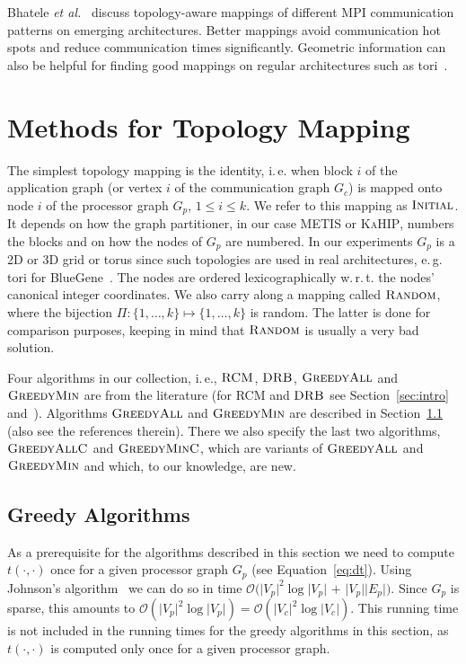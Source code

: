 \documentclass[pdftex]{llncs}
\newcommand{\eg}{e.\,g.\xspace}
\newcommand{\ie}{i.\,e.\xspace}
\newcommand{\bigO}{\mathcal{O}}
\newcommand{\etal}{\textit{et al.}\xspace}
\newcommand{\wrt}{w.\,r.\,t.\xspace}
\newcommand{\metis}{\textsc{METIS}\xspace}
\newcommand{\kahip}{\textsc{KaHIP}\xspace}
\newcommand{\initial}{\textsc{Initial}\xspace}
\newcommand{\random}{\textsc{Random}\xspace}
\newcommand{\rcm}{\textsc{RCM}\xspace}
\newcommand{\durebi}{\textsc{DRB}\xspace}
\newcommand{\greedyall}{\textsc{GreedyAll}\xspace}
\newcommand{\greedyallc}{\textsc{GreedyAllC}\xspace}
\newcommand{\greedymin}{\textsc{GreedyMin}\xspace}
\newcommand{\greedyminc}{\textsc{GreedyMinC}\xspace}
\begin{document}
Bhatele \etal~\cite{Bhatele:2011:AHT:2063384.2063486} discuss topology-aware
mappings of different MPI communication patterns on
emerging architectures. Better mappings avoid communication hot spots
and reduce communication times significantly. Geometric information
can also be helpful for finding good mappings on regular architectures
such as tori~\cite{6063073}.


\section{Methods for Topology Mapping}
\label{sec:algo}
The simplest topology mapping is the identity, \ie when block $i$ of
the application graph (or vertex $i$ of the communication graph $G_c$)
is mapped onto node $i$ of the processor graph $G_p$, $1 \leq i \leq
k$. We refer to this mapping as $\initial$. It depends on how the
graph partitioner, in our case \metis or \kahip, numbers the blocks
and on how the nodes of $G_p$ are numbered. In our experiments $G_p$
is a 2D or 3D grid or torus since such topologies are used in real architectures,
\eg tori for BlueGene~\cite{BlueGene02overview}.
The nodes are ordered
lexicographically \wrt the nodes' canonical integer coordinates. We
also carry along a mapping called $\random$, where the bijection $\Pi:
\{1, \dots, k\} \mapsto \{1, \dots, k\}$ is random. The latter is done
for comparison purposes, keeping in mind that $\random$ is usually a
very bad solution.

Four algorithms in our collection, \ie, $\rcm$, $\durebi$,
$\greedyall$ and $\greedymin$ are from the literature (for \rcm and
$\durebi$ see Section~\ref{sec:intro}
and~\cite{Cuthill69a,hoefler-topomap}). Algorithms $\greedyall$
and $\greedymin$ are described in Section~\ref{subsec:greedy} 
(also see the references therein). There we also specify the last two
algorithms, $\greedyallc$ and $\greedyminc$, which are variants of
$\greedyall$ and $\greedymin$ and which, to our knowledge, are new.

\subsection{Greedy Algorithms}
\label{subsec:greedy}
As a prerequisite for the algorithms described in this section we need
to compute $t(\cdot, \cdot)$ once for a given processor graph $G_p$
(see Equation~\ref{eq:dt}). Using Johnson's
algorithm~\cite{Johnson77a,Cormen2001a} we can do so in time
$\bigO(\vert V_p \vert^2 \log \vert V_p \vert$ $+$ $\vert V_p \vert
\vert E_p \vert)$. Since $G_p$ is sparse, this amounts to $\bigO(\vert
V_p \vert^2 \log \vert V_p \vert) = \bigO(\vert V_c \vert^2 \log \vert
V_c \vert)$. This running time is not included in the running times
for the greedy algorithms in this section, as $t(\cdot, \cdot)$ is
computed only once for a given processor graph.
\end{document}
